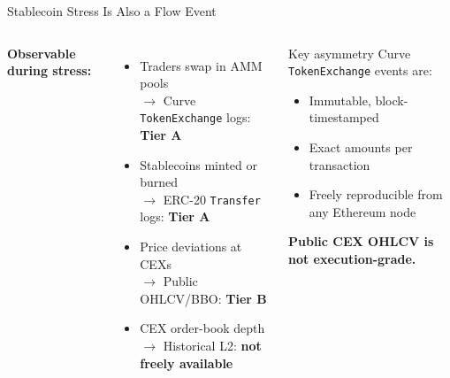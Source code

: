 \documentclass[aspectratio=169,11pt]{beamer}
\begin{document}
\begin{frame}{Stablecoin Stress Is Also a Flow Event}
\begin{columns}[T]
\textbf{Observable during stress:}
\begin{itemize}
  \item Traders swap in AMM pools \\
        \textcolor{cugreen}{$\to$ Curve \texttt{TokenExchange} logs: \textbf{Tier A}}
  \item Stablecoins minted or burned \\
        \textcolor{cugreen}{$\to$ ERC-20 \texttt{Transfer} logs: \textbf{Tier A}}
  \item Price deviations at CEXs \\
        \textcolor{cugrey}{$\to$ Public OHLCV/BBO: \textbf{Tier B}}
  \item CEX order-book depth \\
        \textcolor{cured}{$\to$ Historical L2: \textbf{not freely available}}
\end{itemize}
\begin{block}{Key asymmetry}
Curve \texttt{TokenExchange} events are:
\begin{itemize}
  \item Immutable, block-timestamped
  \item Exact amounts per transaction
  \item Freely reproducible from any Ethereum node
\end{itemize}
\vspace{4pt}
\textbf{Public CEX OHLCV is not execution-grade.}
\end{block}
\end{columns}
\end{frame}
\end{document}

